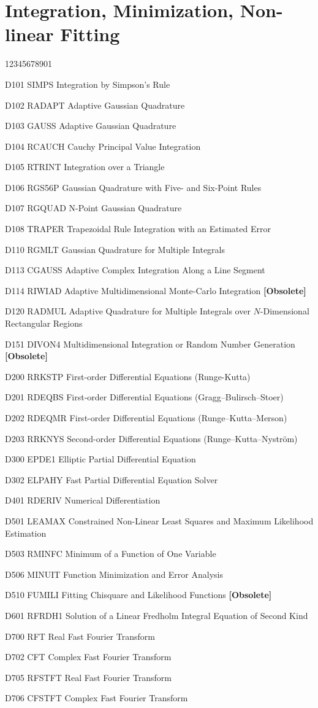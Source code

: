 \section*{Integration, Minimization, Non-linear Fitting}
\begin{DLtt}{12345678901}
\item[D101 SIMPS] Integration by Simpson's Rule
\item[D102 RADAPT] Adaptive Gaussian Quadrature
\item[D103 GAUSS] Adaptive Gaussian Quadrature
\item[D104 RCAUCH] Cauchy Principal Value Integration
\item[D105 RTRINT] Integration over a Triangle
\item[D106 RGS56P] Gaussian Quadrature with Five- and Six-Point Rules
\item[D107 RGQUAD] N-Point Gaussian Quadrature
\item[D108 TRAPER] Trapezoidal Rule Integration with an Estimated Error
\item[D110 RGMLT] Gaussian Quadrature for Multiple Integrals
\item[D113 CGAUSS] Adaptive Complex Integration Along a Line Segment
\item[D114 RIWIAD] Adaptive Multidimensional Monte-Carlo Integration
{\bf [Obsolete]}
\item[D120 RADMUL] Adaptive Quadrature for Multiple Integrals over
$N$-Dimensional Rectangular Regions
\item[D151 DIVON4] Multidimensional Integration or Random Number
Generation {\bf [Obsolete]}
\item[D200 RRKSTP] First-order Differential Equations (Runge-Kutta)
\item[D201 RDEQBS] First-order Differential Equations
(Gragg--Bulirsch--Stoer)
\item[D202 RDEQMR] First-order Differential Equations
(Runge--Kutta--Merson)
\item[D203 RRKNYS] Second-order Differential Equations
(Runge--Kutta--Nystr\"om)
\item[D300 EPDE1] Elliptic Partial Differential Equation
\item[D302 ELPAHY] Fast Partial Differential Equation Solver
\item[D401 RDERIV] Numerical Differentiation
\item[D501 LEAMAX] Constrained Non-Linear Least Squares and Maximum
                   Likelihood Estimation
\item[D503 RMINFC] Minimum of a Function of One Variable
\item[D506 MINUIT] Function Minimization and Error Analysis
\item[D510 FUMILI] Fitting Chisquare and Likelihood Functions
{\bf [Obsolete]}
\item[D601 RFRDH1] Solution of a Linear Fredholm Integral
Equation of Second Kind
\item[D700 RFT] Real Fast Fourier Transform
\item[D702 CFT] Complex Fast Fourier Transform
\item[D705 RFSTFT] Real Fast Fourier Transform
\item[D706 CFSTFT] Complex Fast Fourier Transform
\end{DLtt}
